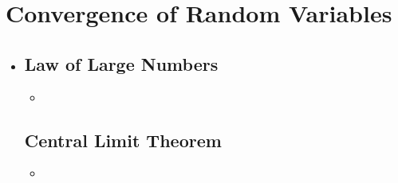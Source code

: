 \section{Convergence of Random Variables}
\begin{itemize}
  \item[]
  
  \subsection{Law of Large Numbers}
  \begin{itemize}
    \item 
  \end{itemize}

  \subsection{Central Limit Theorem}
  \begin{itemize}
    \item 
  \end{itemize}
  
\end{itemize}

